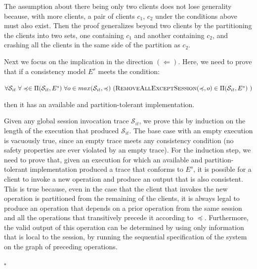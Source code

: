 \documentclass[journal,compsoc]{IEEEtran}
\begin{document}
The assumption about there being only two clients does not lose generality because, with more clients, a pair of clients $c_1$, $c_2$ under the conditions above must also exist. Then the proof generalizes beyond two clients by the partitioning the clients into two sets, one containing $c_1$ and another containing $c_2$, and crashing all the clients in the same side of the partition as $c_2$.

Next we focus on the implication in the direction $(\Leftarrow)$. Here, we need to prove that if a consistency model $E^s$ meets the condition:

\noindent $\forall \mathcal{S}_{it} ~ \forall \preccurlyeq \in \Pi(\mathcal{S}_{it},E^s) ~ \forall o \in max(\mathcal{S}_{it}, \preccurlyeq) ~ (\textsc{RemoveAllExceptSession}(\preccurlyeq,o) \in \Pi(\mathcal{S}_{it},E^s) ~ ) $

then it has an available and partition-tolerant implementation. 



Given any global session invocation trace $\mathcal{S}_{it}$, we prove this by induction on the length of the execution that produced $\mathcal{S}_{it}$. The base case with an empty execution is vacuously true, since an empty trace meets any consistency condition (no safety properties are ever violated by an empty trace). For the induction step, we need to prove that, given an execution for which an available and partition-tolerant implementation produced a trace that conforms to $E^s$, it is possible for a client to invoke a new operation and produce an output that is also consistent. This is true because, even in the case that the client that invokes the new operation is partitioned from the remaining of the clients, it is always legal to produce an operation that depends on a prior operation from the same session and all the operations that transitively precede it according to $\preccurlyeq$. Furthermore, the valid output of this operation can be determined by using only information that is local to the session, by running the sequential specification of the system on the graph of preceding operations.

\begin{flushright}
$\square$
\end{flushright}
 
\end{document}
